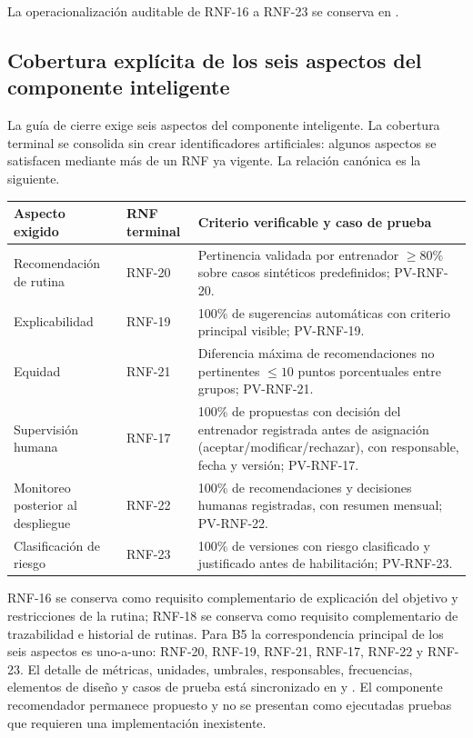 \documentclass[11pt,a4paper,twoside]{article}
\begin{document}
La operacionalización auditable de RNF-16 a RNF-23 se conserva en .

\subsection{Cobertura explícita de los seis aspectos del componente inteligente}
La guía de cierre exige seis aspectos del componente inteligente. La cobertura terminal se consolida sin crear identificadores artificiales: algunos aspectos se satisfacen mediante más de un RNF ya vigente. La relación canónica es la siguiente.

\begin{tabularx}{\textwidth}{p{3.0cm}p{2.7cm}X}\toprule
Aspecto exigido & RNF terminal & Criterio verificable y caso de prueba \\ \midrule
Recomendación de rutina & RNF-20 & Pertinencia validada por entrenador $\geq 80\%$ sobre casos sintéticos predefinidos; PV-RNF-20. \\
Explicabilidad & RNF-19 & 100\% de sugerencias automáticas con criterio principal visible; PV-RNF-19. \\
Equidad & RNF-21 & Diferencia máxima de recomendaciones no pertinentes $\leq 10$ puntos porcentuales entre grupos; PV-RNF-21. \\
Supervisión humana & RNF-17 & 100\% de propuestas con decisión del entrenador registrada antes de asignación (aceptar/modificar/rechazar), con responsable, fecha y versión; PV-RNF-17. \\
Monitoreo posterior al despliegue & RNF-22 & 100\% de recomendaciones y decisiones humanas registradas, con resumen mensual; PV-RNF-22. \\
Clasificación de riesgo & RNF-23 & 100\% de versiones con riesgo clasificado y justificado antes de habilitación; PV-RNF-23. \\
\bottomrule
\end{tabularx}

RNF-16 se conserva como requisito complementario de explicación del objetivo y restricciones de la rutina; RNF-18 se conserva como requisito complementario de trazabilidad e historial de rutinas. Para B5 la correspondencia principal de los seis aspectos es uno-a-uno: RNF-20, RNF-19, RNF-21, RNF-17, RNF-22 y RNF-23. El detalle de métricas, unidades, umbrales, responsables, frecuencias, elementos de diseño y casos de prueba está sincronizado en  y . El componente recomendador permanece propuesto y no se presentan como ejecutadas pruebas que requieren una implementación inexistente.
\end{document}
